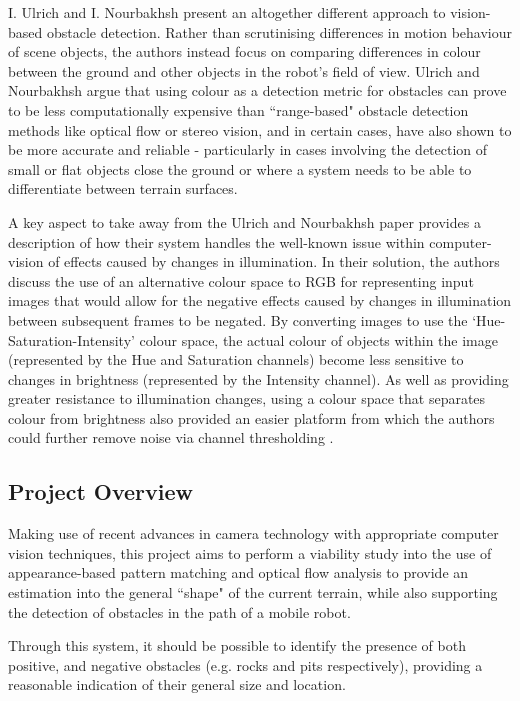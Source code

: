 I. Ulrich and I. Nourbakhsh \cite{ulrich-nourbakhsh} present an altogether different approach to vision-based obstacle detection. Rather than scrutinising differences in motion behaviour of scene objects, the authors instead focus on comparing differences in colour between the ground and other objects in the robot's field of view. Ulrich and Nourbakhsh argue that using colour as a detection metric for obstacles can prove to be less computationally expensive than ``range-based" obstacle detection methods like optical flow or stereo vision, and in certain cases, have also shown to be more accurate and reliable - particularly in cases involving the detection of small or flat objects close the ground or where a system needs to be able to differentiate between terrain surfaces. 

A key aspect to take away from the Ulrich and Nourbakhsh paper provides a description of how their system handles the well-known issue within computer-vision of effects caused by changes in illumination. In their solution, the authors discuss the use of an alternative colour space to RGB for representing input images that would allow for the negative effects caused by changes in illumination between subsequent frames to be negated. By converting images to use the `Hue-Saturation-Intensity' colour space, the actual colour of objects within the image (represented by the Hue and Saturation channels) become less sensitive to changes in brightness (represented by the Intensity channel). As well as providing greater resistance to illumination changes, using a colour space that separates colour from brightness also provided an easier platform from which the authors could further remove noise via channel thresholding \cite{ulrich-nourbakhsh}. 


\subsection{Project Overview}

Making use of recent advances in camera technology with appropriate computer vision techniques, this project aims to perform a viability study into the use of appearance-based pattern matching and optical flow analysis to provide an estimation into the general ``shape" of the current terrain, while also supporting the detection of obstacles in the path of a mobile robot. 

Through this system, it should be possible to identify the presence of both positive, and negative obstacles (e.g. rocks and pits respectively), providing a reasonable indication of their general size and location.

